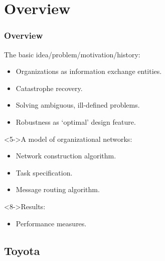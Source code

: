 \section{Overview}

\begin{frame}
  \frametitle{Overview}

  \begin{block}{The basic idea/problem/motivation/history:}
    \begin{itemize}
    \item<1-> 
      Organizations as information exchange entities.
    \item<2-> 
      Catastrophe recovery.
    \item<3-> 
      Solving ambiguous, ill-defined problems.
    \item<4->
      Robustness as `optimal' design feature.
    \end{itemize}
  \end{block}

  \begin{block}<5->{A model of organizational networks:}
    \begin{itemize}
    \item<5->
      Network construction algorithm.
    \item<6->
      Task specification.
    \item<7->
      Message routing algorithm.
    \end{itemize}
  \end{block}

  \begin{block}<8->{Results:}
    \begin{itemize}
    \item<8->
      Performance measures.
    \end{itemize}
  \end{block}

\end{frame}

\subsection{Toyota}


